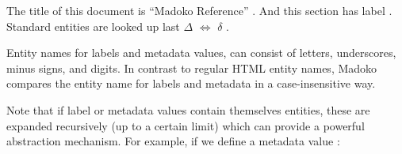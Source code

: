 \documentclass{book}
\begin{document}
\begin{mdDiv}[class={sample},elem={sample},margin-bottom={2ex},data-line={2377}]%
\begin{mdDiv}[class={sampleblock},elem={sampleblock},padding-left={1em},padding-right={1em},padding-top={-1ex},border-style={solid},border-width={1\cssPixel},line-adjust={0},data-line={2378}]%
\begin{mdPre}[class={para-block,samplesource,noescape,pre-fenced},line-adjust={0},data-line={2378},data-line-code={2379}]%
%
\end{mdPre}%
\mdHr[class={madoko},width={0.50\linewidth},text-align={left},data-line={2383}]{}\begin{mdP}[data-line={2384}]%
{}The title of this document is %
{}{\textquotedblleft}Madoko Reference{\textquotedblright}%
{}.%
{}\mdBr
{}And this section has label %
{}%
{}.%
{}\mdBr
{}Standard entities are looked up last %
{}\ensuremath{\Delta}%
{}\ensuremath{\Leftrightarrow}%
{}\ensuremath{\delta}%
{}.%
\end{mdP}%
\end{mdDiv}%
\end{mdDiv}%
\begin{mdP}[data-line={2383}]%
{}Entity names for labels and metadata values, can consist of letters, underscores, 
minus signs, and digits. In contrast to regular HTML entity names, Madoko compares
the entity name for labels and metadata in a case-insensitive way.%
\end{mdP}%
\begin{mdP}[class={indent},data-line={2387}]%
{}Note that if label or metadata values contain themselves entities, these are 
expanded recursively (up to a certain limit) which can provide a powerful abstraction
mechanism. For example, if we define a metadata value %
{}%
{}:%
\end{mdP}%
\end{document}
